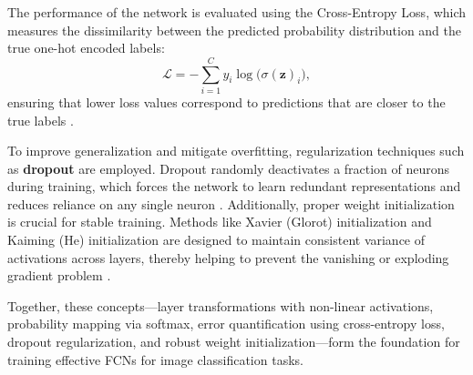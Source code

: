 \documentclass[11pt]{amsart}
\begin{document}
The performance of the network is evaluated using the Cross-Entropy Loss, which measures the dissimilarity between the predicted probability distribution and the true one-hot encoded labels:
\[
\mathcal{L} = -\sum_{i=1}^{C} y_i \log\big(\sigma(\mathbf{z})_i\big),
\]
ensuring that lower loss values correspond to predictions that are closer to the true labels \cite{Goodfellow-et-al-2016}.

To improve generalization and mitigate overfitting, regularization techniques such as \textbf{dropout} are employed. Dropout randomly deactivates a fraction of neurons during training, which forces the network to learn redundant representations and reduces reliance on any single neuron \cite{srivastava2014dropout}. Additionally, proper weight initialization is crucial for stable training. Methods like Xavier (Glorot) initialization and Kaiming (He) initialization are designed to maintain consistent variance of activations across layers, thereby helping to prevent the vanishing or exploding gradient problem \cite{he2015delving}.

Together, these concepts—layer transformations with non-linear activations, probability mapping via softmax, error quantification using cross-entropy loss, dropout regularization, and robust weight initialization—form the foundation for training effective FCNs for image classification tasks.
\end{document}
